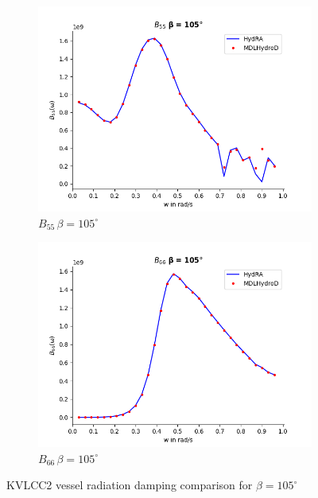 \begin{figure}[H]
\begin{subfigure}[b]{0.45\textwidth}
        \includegraphics[width=\textwidth]{plots/kvlcc/radiation_damp/b55.png}
        \caption{$B_{55} \, \beta = 105^{\circ}$}
    \end{subfigure}
    \begin{subfigure}[b]{0.45\textwidth}
        \includegraphics[width=\textwidth]{plots/kvlcc/radiation_damp/b66.png}
        \caption{$B_{66} \, \beta = 105^{\circ}$}
    \end{subfigure}
    \caption{KVLCC2 vessel radiation damping comparison for $\beta= 105^{\circ}$}
    \label{fig:kvlcc_radition_damp_105}
\end{figure}

